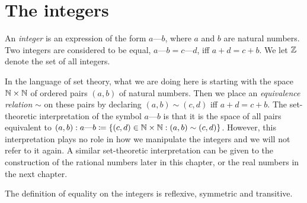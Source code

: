 \section{The integers}\label{sec:4.1}

\begin{defn}[Integers]\label{4.1.1}
  An \emph{integer} is an expression of the form \(a \text{---} b\), where \(a\) and \(b\) are natural numbers.
  Two integers are considered to be equal, \(a \text{---} b = c \text{---} d\), iff \(a + d = c + b\).
  We let \(\mathbb{Z}\) denote the set of all integers.
\end{defn}

\begin{note}
  In the language of set theory, what we are doing here is starting with the space \(\mathbb{N} \times \mathbb{N}\) of ordered pairs \((a, b)\) of natural numbers.
  Then we place an \emph{equivalence relation} \(\sim\) on these pairs by declaring \((a, b) \sim (c, d)\) iff \(a + d = c + b\).
  The set-theoretic interpretation of the symbol \(a \text{---} b\) is that it is the space of all pairs equivalent to \((a, b): a \text{---} b \coloneqq \{(c, d) \in \mathbb{N} \times \mathbb{N} : (a, b) \sim (c, d)\}\).
  However, this interpretation plays no role in how we manipulate the integers and we will not refer to it again.
  A similar set-theoretic interpretation can be given to the construction of the rational numbers later in this chapter, or the real numbers in the next chapter.
\end{note}

\begin{ac}\label{ac:4.1.1}
  The definition of equality on the integers is reflexive, symmetric and transitive.
\end{ac}

